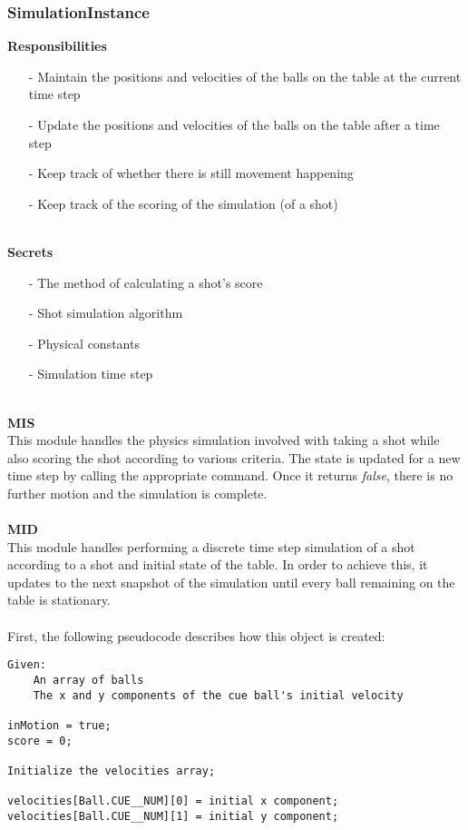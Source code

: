 \documentclass[titlepage]{article}
\begin{document}
\subsubsection{SimulationInstance}
\textbf{Responsibilities}
\begin{itemize}
	\item[-] Maintain the positions and velocities of the balls on the table at the current time step
	\item[-] Update the positions and velocities of the balls on the table after a time step
	\item[-] Keep track of whether there is still movement happening
	\item[-] Keep track of the scoring of the simulation (of a shot)
\end{itemize}~\\
\textbf{Secrets}
\begin{itemize}
	\item[-] The method of calculating a shot's score
	\item[-] Shot simulation algorithm
	\item[-] Physical constants
	\item[-] Simulation time step
\end{itemize}~\\
\textbf{MIS}\\[2mm]
This module handles the physics simulation involved with taking a shot while also scoring the shot according to various criteria. The state is updated for a new time step by calling the appropriate command. Once it returns \textit{false}, there is no further motion and the simulation is complete.
\\\\
\textbf{MID}\\[2mm]
This module handles performing a discrete time step simulation of a shot according to a shot and initial state of the table. In order to achieve this, it updates to the next snapshot of the simulation until every ball remaining on the table is stationary.\\~\\
First, the following pseudocode describes how this object is created:
\begin{lstlisting}
Given:
	An array of balls
	The x and y components of the cue ball's initial velocity
	
inMotion = true;
score = 0;

Initialize the velocities array;

velocities[Ball.CUE__NUM][0] = initial x component;
velocities[Ball.CUE__NUM][1] = initial y component;
\end{lstlisting}~\\\\
\end{document}
